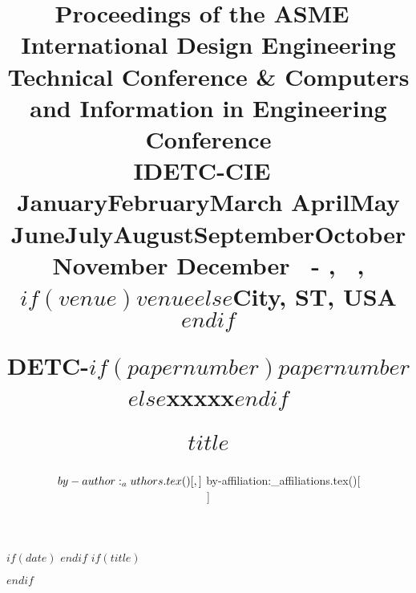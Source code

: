 \usepackage{advdate}
$if(date)$
\SetDate[$date$]
\FixDate
$endif$
\newcommand{\daterange}{
  \ifcase \the\month \or January\or February\or March\or %
    April\or May \or June\or July\or August\or September\or October\or November\or %
    December
  \fi
  ~\the\day -\AdvanceDate[3]\the\day
  ,~\the\year
}
$if(title)$
\title{
  \bfseries\sffamily\normalsize
  \begin{flushright}
    \vspace*{-2\baselineskip}
    {\fontsize{11pt}{12pt}\selectfont Proceedings of the ASME~\the\year\\International Design Engineering Technical Conference \& Computers and Information in Engineering Conference\\
      IDETC-CIE~\the\year\\
      \daterange, $if(venue)$$venue$$else$City, ST, USA$endif$\\}

    \vspace*{2\baselineskip}
    {\LARGE DETC\the\year -$if(papernumber)$$papernumber$$else$xxxxx$endif$}\\
    \vspace*{2.5\baselineskip}
  \end{flushright}
  \large\MakeUppercase{$title$}
}
$endif$

\author{${  by-author:_authors.tex()[, ] }\vspace{\baselineskip}\\ ${  by-affiliation:_affiliations.tex()[\\ ] }}

\date{ }